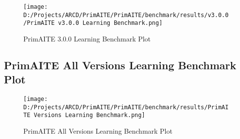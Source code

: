 \documentclass{article}%
\begin{document}
\begin{figure}[h!]%
\centering%
\texttt{[image: D:/Projects/ARCD/PrimAITE/PrimAITE/benchmark/results/v3.0.0/PrimAITE v3.0.0 Learning Benchmark.png]}%
\caption{PrimAITE 3.0.0 Learning Benchmark Plot}%
\end{figure}

%
\subsection{PrimAITE All Versions Learning Benchmark Plot}%
\label{subsec:PrimAITEAllVersionsLearningBenchmarkPlot}%


\begin{figure}[h!]%
\centering%
\texttt{[image: D:/Projects/ARCD/PrimAITE/PrimAITE/benchmark/results/PrimAITE Versions Learning Benchmark.png]}%
\caption{PrimAITE All Versions Learning Benchmark Plot}%
\end{figure}

%
\end{document}
